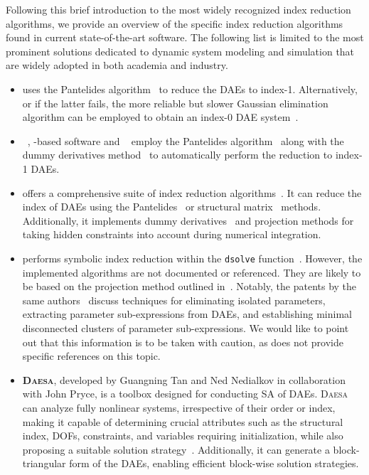 Following this brief introduction to the most widely recognized index reduction algorithms, we provide an overview of the specific index reduction algorithms found in current state-of-the-art software. The following list is limited to the most prominent solutions dedicated to dynamic system modeling and simulation that are widely adopted in both academia and industry.
%
\begin{itemize}
  \setlength{\itemsep}{0.0em}
  \item \textbf{\Matlab{}} uses the Pantelides algorithm~\cite{pantelides1988consistent} to reduce the \acp{DAE} to index-1. Alternatively, or if the latter fails, the more reliable but slower Gaussian elimination algorithm can be employed to obtain an index-0 \ac{DAE} system~\cite{matlab}.
  \item \textbf{\Modelica{}}~\cite{mattsson1997modelica, mattsson1998physical}, \Modelica{}-based software and \textbf{\ModelingToolkit{}}~\cite{modelingtoolkit} employ the Pantelides algorithm~\cite{pantelides1988consistent} along with the dummy derivatives method~\cite{mattsson1993index} to automatically perform the reduction to index-1 \acp{DAE}.
  \item \textbf{\Mathematica{}} offers a comprehensive suite of index reduction algorithms~\cite{mathematica}. It can reduce the index of \acp{DAE} using the Pantelides~\cite{pantelides1988consistent} or structural matrix~\cite{unger1995structural, chowdhry2004symbolic} methods. Additionally, it implements dummy derivatives~\cite{mattsson1993index} and projection methods for taking hidden constraints into account during numerical integration.
  \item \textbf{\Maple{}} performs symbolic index reduction within the \texttt{dsolve} function~\cite{maple}. However, the implemented algorithms are not documented or referenced. They are likely to be based on the projection method outlined in~\cite{shmoylova2013simplification}. Notably, the patents by the same authors~\cite{postma2012exact, shmoylova2012method, postma2015exact} discuss techniques for eliminating isolated parameters, extracting parameter sub-expressions from \acp{DAE}, and establishing minimal disconnected clusters of parameter sub-expressions. We would like to point out that this information is to be taken with caution, as \Maple{} does not provide specific references on this topic.
  \item \textbf{\textsc{Daesa}}, developed by Guangning Tan and Ned Nedialkov in collaboration with John Pryce, is a \Matlab{} toolbox designed for conducting \ac{SA} of \acp{DAE}. \textsc{Daesa} can analyze fully nonlinear systems, irrespective of their order or index, making it capable of determining crucial attributes such as the structural index, \acp{DOF}, constraints, and variables requiring initialization, while also proposing a suitable solution strategy~\cite{nedialkov2015algorithm, tan2016symbolic}. Additionally, it can generate a block-triangular form of the \acp{DAE}, enabling efficient block-wise solution strategies.

\end{itemize}
